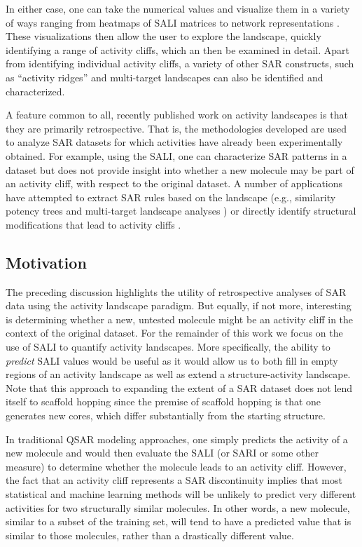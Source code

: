 \documentclass[letterpaper, 12pt]{article}
\begin{document}
In either case, one can take the numerical values and visualize them in a variety of ways ranging
from heatmaps of SALI matrices to network representations \cite{Wawer:2008aa,Guha:2008aa}. These
visualizations then allow the user to explore the landscape, quickly identifying a range of activity
cliffs, which an then be examined in detail. Apart from identifying individual activity cliffs, a
variety of other SAR constructs, such as ``activity ridges'' \cite{Vogt:2011bs} and multi-target
landscapes\cite{Dimova:2011fk} can also be identified and characterized.

A feature common to all, recently published work on activity landscapes is that they are primarily
retrospective. That is, the methodologies developed are used to analyze SAR datasets for which
activities have already been experimentally obtained. For example, using the SALI, one can
characterize SAR patterns in a dataset but does not provide insight into whether a new molecule may
be part of an activity cliff, with respect to the original dataset. A number of applications have
attempted to extract SAR rules based on the landscape (e.g., similarity potency trees
\cite{Wawer:2010fv} and multi-target landscape analyses \cite{Hu:2010kl}) or directly identify
structural modifications that lead to activity cliffs \cite{Wassermann:2010oq, Peltason:2009vn}.

\subsection{Motivation}
\label{sec:motivation}
The preceding discussion highlights the utility of retrospective analyses of SAR data using the
activity landscape paradigm. But equally, if not more, interesting is determining whether a new,
untested molecule might be an activity cliff in the context of the original dataset. For the
remainder of this work we focus on the use of SALI to quantify activity landscapes. More
specifically, the ability to \emph{predict} SALI values would be useful as it would allow us to both
fill in empty regions of an activity landscape as well as extend a structure-activity
landscape. Note that this approach to expanding the extent of a SAR dataset does not lend itself to
scaffold hopping since the premise of scaffold hopping is that one generates new cores, which differ
substantially from the starting structure.

In traditional QSAR modeling approaches, one simply predicts the activity of a new molecule and
would then evaluate the SALI (or SARI or some other measure) to determine whether the molecule leads
to an activity cliff. However, the fact that an activity cliff represents a SAR
discontinuity\cite{Maggiora:2006aa} implies that most statistical and machine learning methods will
be unlikely to predict very different activities for two structurally similar molecules. In other
words, a new molecule, similar to a subset of the training set, will tend to have a predicted value
that is similar to those molecules, rather than a drastically different value.
\end{document}
